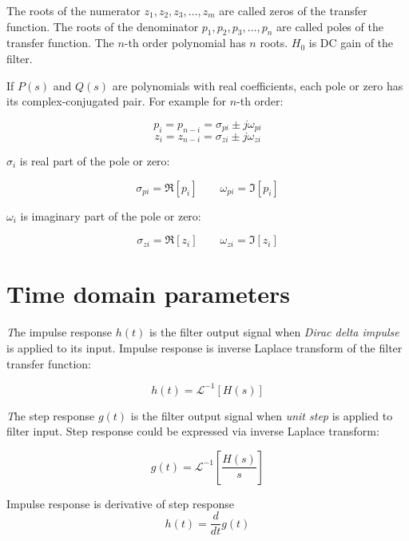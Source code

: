 The roots of the numerator $z_1,z_2,z_3,\ldots,z_m$ are called zeros of the
transfer function. The roots of the denominator $p_1,p_2,p_3,\ldots,p_n$ are
called poles of the transfer function. The $n$-th order polynomial has $n$
roots. $H_0$ is DC gain of the filter.

If $P(s)$ and $Q(s)$ are polynomials with real coefficients, each pole or zero
has its complex-conjugated pair. For example for $n$-th order:

\begin{equation}
 p_{i}=p_{n-i} = \sigma_{pi}\pm j\omega_{pi} \label{pole}
\end{equation}
\begin{equation}
 z_{i}=z_{n-i} = \sigma_{zi}\pm j\omega_{zi} \label{zero}
\end{equation}

$\sigma_i$ is real part of the pole or zero: 

\begin{equation}
\sigma_{pi}=\Re[p_i]\qquad\omega_{pi}=\Im[p_i] 
\end{equation}

$\omega_i$ is imaginary part of the pole or zero:

\begin{equation}
\sigma_{zi}=\Re[z_i]\qquad\omega_{zi}=\Im[z_i]
\end{equation}

\section{Time domain parameters}

\emph The {impulse response} $h(t)$ is the filter output signal when \emph{Dirac
delta impulse} is applied to its input. Impulse response is inverse Laplace
transform of the filter transfer function:

\begin{equation}
 h(t)=\mathcal{L}^{-1}[H(s)]
\end{equation}

\emph The {step response} $g(t)$ is the filter output signal when \emph{unit
step} is applied to filter input. Step response could be expressed via inverse
Laplace transform:

\begin{equation}
 g(t)=\mathcal{L}^{-1}\left[\frac{H(s)}{s}\right]
\end{equation}

Impulse response is derivative of step response
\begin{equation}
 h(t)=\frac{d}{dt}g(t)
\end{equation}

